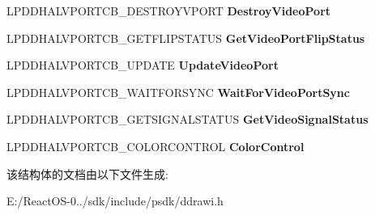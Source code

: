 \begin{DoxyCompactItemize}
\item 
\mbox{\label{struct___d_d_h_a_l___d_d_v_i_d_e_o_p_o_r_t_c_a_l_l_b_a_c_k_s_a99e472433d2968a488ed639568159b4b}} 
L\+P\+D\+D\+H\+A\+L\+V\+P\+O\+R\+T\+C\+B\+\_\+\+D\+E\+S\+T\+R\+O\+Y\+V\+P\+O\+RT {\bfseries Destroy\+Video\+Port}
\item 
\mbox{\label{struct___d_d_h_a_l___d_d_v_i_d_e_o_p_o_r_t_c_a_l_l_b_a_c_k_s_a75bcf2446532762aa6047924cef45441}} 
L\+P\+D\+D\+H\+A\+L\+V\+P\+O\+R\+T\+C\+B\+\_\+\+G\+E\+T\+F\+L\+I\+P\+S\+T\+A\+T\+US {\bfseries Get\+Video\+Port\+Flip\+Status}
\item 
\mbox{\label{struct___d_d_h_a_l___d_d_v_i_d_e_o_p_o_r_t_c_a_l_l_b_a_c_k_s_ac8ce85b35ebc857e0c096141bf5d9c48}} 
L\+P\+D\+D\+H\+A\+L\+V\+P\+O\+R\+T\+C\+B\+\_\+\+U\+P\+D\+A\+TE {\bfseries Update\+Video\+Port}
\item 
\mbox{\label{struct___d_d_h_a_l___d_d_v_i_d_e_o_p_o_r_t_c_a_l_l_b_a_c_k_s_a18e7b70dce0618090cb6d329ef289ea5}} 
L\+P\+D\+D\+H\+A\+L\+V\+P\+O\+R\+T\+C\+B\+\_\+\+W\+A\+I\+T\+F\+O\+R\+S\+Y\+NC {\bfseries Wait\+For\+Video\+Port\+Sync}
\item 
\mbox{\label{struct___d_d_h_a_l___d_d_v_i_d_e_o_p_o_r_t_c_a_l_l_b_a_c_k_s_a80773e54ae96b374b0bd58750267d8c9}} 
L\+P\+D\+D\+H\+A\+L\+V\+P\+O\+R\+T\+C\+B\+\_\+\+G\+E\+T\+S\+I\+G\+N\+A\+L\+S\+T\+A\+T\+US {\bfseries Get\+Video\+Signal\+Status}
\item 
\mbox{\label{struct___d_d_h_a_l___d_d_v_i_d_e_o_p_o_r_t_c_a_l_l_b_a_c_k_s_ac48ff4a50a51d1a50fa7ad2a8db4cf8c}} 
L\+P\+D\+D\+H\+A\+L\+V\+P\+O\+R\+T\+C\+B\+\_\+\+C\+O\+L\+O\+R\+C\+O\+N\+T\+R\+OL {\bfseries Color\+Control}
\end{DoxyCompactItemize}


该结构体的文档由以下文件生成\+:\begin{DoxyCompactItemize}
\item 
E\+:/\+React\+O\+S-\/0../sdk/include/psdk/ddrawi.\+h\end{DoxyCompactItemize}

